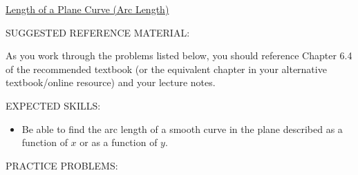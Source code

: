 \documentclass[12pt]{article}
\begin{document}
\begin{center}
\underline{\LARGE{Length of a Plane Curve (Arc Length)}}
\end{center}

\bigskip

\noindent SUGGESTED REFERENCE MATERIAL:

\bigskip

\noindent As you work through the problems listed below, you should reference Chapter 6.4 of the recommended textbook (or the equivalent chapter in your alternative textbook/online resource) and your lecture notes.

\bigskip

\noindent EXPECTED SKILLS:

\begin{itemize}

\item Be able to find the arc length of a smooth curve in the plane described as a function of $x$ or as a function of $y$.

\end{itemize}

\noindent PRACTICE PROBLEMS:

\medskip

\end{document}
